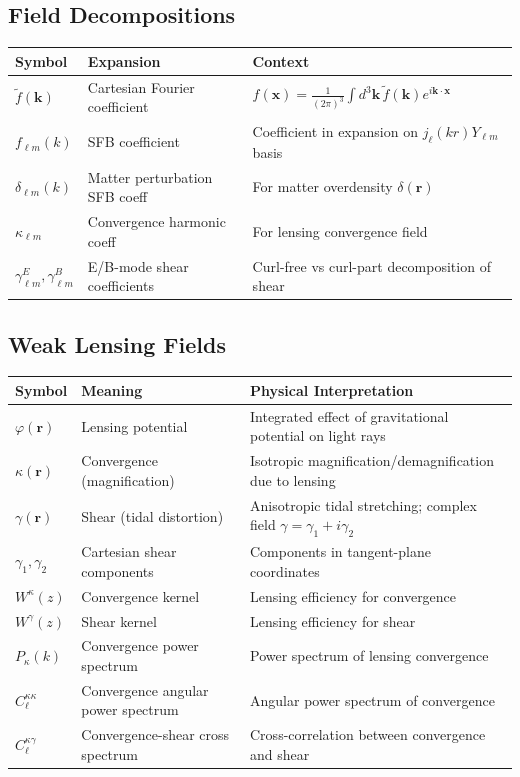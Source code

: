 \subsection{Field Decompositions}\label{subsec:notation_fields}

\begin{longtable}{l l p{10cm}}
\toprule
\textbf{Symbol} & \textbf{Expansion} & \textbf{Context} \\
\midrule
\endhead
\bottomrule
\endfoot

$\tilde{f}(\mathbf{k})$ & Cartesian Fourier coefficient & $f(\mathbf{x}) = \frac{1}{(2\pi)^3} \int d^3\mathbf{k} \, \tilde{f}(\mathbf{k}) e^{i\mathbf{k} \cdot \mathbf{x}}$ \\
$f_{\ell m}(k)$ & SFB coefficient & Coefficient in expansion on $j_\ell(kr) Y_{\ell m}$ basis \\
$\delta_{\ell m}(k)$ & Matter perturbation SFB coeff & For matter overdensity $\delta(\mathbf{r})$ \\
$\kappa_{\ell m}$ & Convergence harmonic coeff & For lensing convergence field \\
$\gamma^E_{\ell m}, \gamma^B_{\ell m}$ & E/B-mode shear coefficients & Curl-free vs curl-part decomposition of shear \\
\end{longtable}

\subsection{Weak Lensing Fields}\label{subsec:notation_lensing}

\begin{longtable}{l l p{10cm}}
\toprule
\textbf{Symbol} & \textbf{Meaning} & \textbf{Physical Interpretation} \\
\midrule
\endhead
\bottomrule
\endfoot

$\varphi(\mathbf{r})$ & Lensing potential & Integrated effect of gravitational potential on light rays \\
$\kappa(\mathbf{r})$ & Convergence (magnification) & Isotropic magnification/demagnification due to lensing \\
$\gamma(\mathbf{r})$ & Shear (tidal distortion) & Anisotropic tidal stretching; complex field $\gamma = \gamma_1 + i\gamma_2$ \\
$\gamma_1, \gamma_2$ & Cartesian shear components & Components in tangent-plane coordinates \\
$W^\kappa(z)$ & Convergence kernel & Lensing efficiency for convergence \\
$W^\gamma(z)$ & Shear kernel & Lensing efficiency for shear \\
$P_\kappa(k)$ & Convergence power spectrum & Power spectrum of lensing convergence \\
$C_\ell^{\kappa\kappa}$ & Convergence angular power spectrum & Angular power spectrum of convergence \\
$C_\ell^{\kappa\gamma}$ & Convergence-shear cross spectrum & Cross-correlation between convergence and shear \\
\end{longtable}

